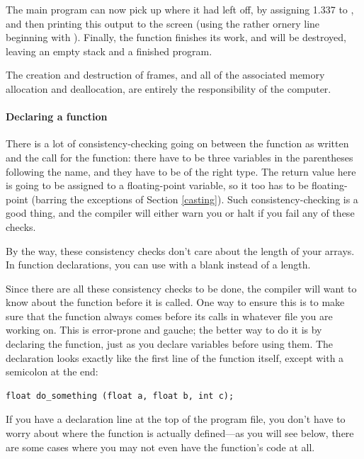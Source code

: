 \documentclass[12pt]{article}
\begin{document}
The main program can now pick up where it had left off, by assigning
1.337 to , and then printing this output to the screen
(using the rather ornery line beginning with ).
Finally, the  function 
finishes its work, and will be destroyed, leaving an empty stack and a
finished program.

The creation and destruction of frames, and all of the associated
memory allocation and deallocation, are entirely the responsibility of
the computer.   

\paragraph{Declaring a function} 
There is a lot of consistency-checking going on between the function as
written and the call for the function: there have to be three variables
in the parentheses following the name, and they have to be of the right
type. The return value here is going to be assigned to a floating-point
variable, so it too has to be floating-point (barring the exceptions of
Section \ref{casting}). Such consistency-checking is a good thing, and
the compiler will either warn you or halt if you fail any of these checks.

By the way, these consistency checks don't care about the length of
your arrays. In function declarations, you can use 
with a blank instead of a length.  

Since there are all these consistency
checks to be done, the compiler will want to know about the function
before it is called. One way to ensure this is to make sure that
the function always comes before its calls in whatever file you are
working on. This is error-prone and gauche; the better way to do it is
by declaring the function, just as you declare variables before using
them. The declaration looks exactly like the first line of the function
itself, except with a semicolon at the end:

\begin{lstlisting}
float do_something (float a, float b, int c);
\end{lstlisting}

If you have a declaration line at the top of the program file, you don't
have to worry about where the function is actually defined---as
you will see below, there are some cases where you may not even have the
function's code at all. 
\end{document}
